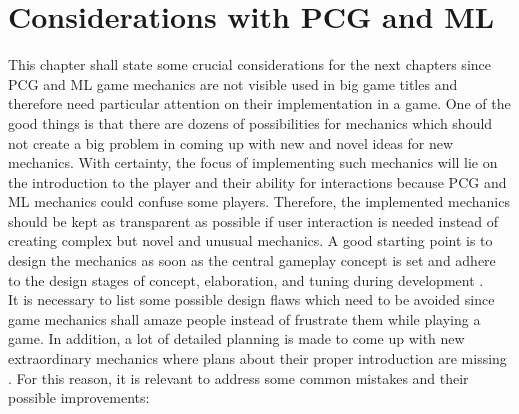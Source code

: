 \documentclass[MGS,Master,english]{twbook}%
\begin{document}
\section{Considerations with \acl{PCG} and \acl{ML}} \label{mechanicsConsiderationsPCGandML}
This chapter shall state some crucial considerations for the next chapters since \ac{PCG} and \ac{ML} game mechanics are not visible used in big game titles and therefore need particular attention on their implementation in a game. One of the good things is that there are dozens of possibilities for mechanics which should not create a big problem in coming up with new and novel ideas for new mechanics. With certainty, the focus of implementing such mechanics will lie on the introduction to the player and their ability for interactions because PCG and ML mechanics could confuse some players. Therefore, the implemented mechanics should be kept as transparent as possible if user interaction is needed instead of creating complex but novel and unusual mechanics. A good starting point is to design the mechanics as soon as the central gameplay concept is set and adhere to the design stages of concept, elaboration, and tuning during development \cite{gameDesign::gameMechanicsAdvancedGameDesign}.\\
It is necessary to list some possible design flaws which need to be avoided since game mechanics shall amaze people instead of frustrate them while playing a game. In addition, a lot of detailed planning is made to come up with new extraordinary mechanics where plans about their proper introduction are missing \cite{mechanic::gamasutra::MaxPears}. For this reason, it is relevant to address some common mistakes and their possible improvements:
\end{document}
